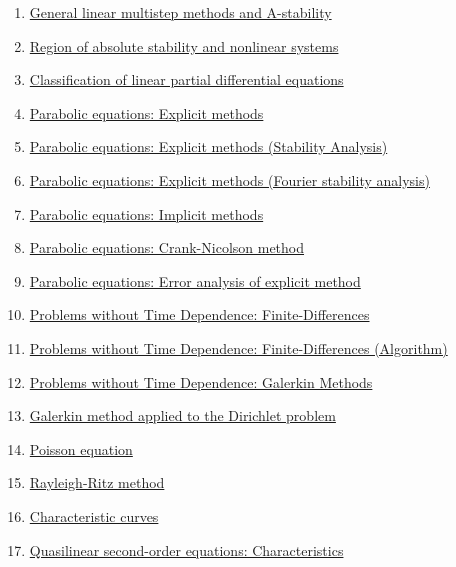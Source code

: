 \documentclass[11pt]{article}
\begin{document}
\begin{enumerate}
	\item \href{https://mp.weixin.qq.com/s/Xu8PFG19wgOVUeJvb6GUMw}{General linear multistep methods and A-stability}	%
	\item \href{https://mp.weixin.qq.com/s/x_Q63zezD9Idly3rqU3O4A}{Region of absolute stability and nonlinear systems}	%
	\item \href{https://mp.weixin.qq.com/s/hQwLSIUxOQRqCAEDzQWGiw}{Classification of linear partial differential equations}	%
	\item \href{https://mp.weixin.qq.com/s/6Jt0I-7cW339sH1v0oyqOQ}{Parabolic equations: Explicit methods}	%
	\item \href{https://mp.weixin.qq.com/s/jhksCPMaXOu-9Y_eLyW7fA}{Parabolic equations: Explicit methods (Stability Analysis)}	%
	\item \href{https://mp.weixin.qq.com/s/nS8FEpAsGxcsuu7hAsRSEg}{Parabolic equations: Explicit methods (Fourier stability analysis)}	%
	\item \href{https://mp.weixin.qq.com/s/n-fPLB8Njg2L0btFBCn7dA}{Parabolic equations: Implicit methods}	%
	\item \href{https://mp.weixin.qq.com/s/fYdvq50W_Diw039Y-z7edA}{Parabolic equations: Crank-Nicolson method}	%
	\item \href{https://mp.weixin.qq.com/s/EtnsYTlfSP5DghytGGcWTw}{Parabolic equations: Error analysis of explicit method}	%
	\item \href{https://mp.weixin.qq.com/s/gMZmGNhHuwFk8HuR9bAHSA}{Problems without Time Dependence: Finite-Differences}	%
	\item \href{https://mp.weixin.qq.com/s/YKzkJg3_shBJeKD24UVEfg}{Problems without Time Dependence: Finite-Differences (Algorithm)}	%
	\item \href{https://mp.weixin.qq.com/s/VFTq8TpZoqnIZEi-NHFEpw}{Problems without Time Dependence: Galerkin Methods}	%
	\item \href{https://mp.weixin.qq.com/s/Bj8yA-qnGVRNjC7Jf6r7WA}{Galerkin method applied to the Dirichlet problem}	%
	\item \href{https://mp.weixin.qq.com/s/jZx_Cdt-M01n8DMY8KMooA}{Poisson equation}	%
	\item \href{https://mp.weixin.qq.com/s/29LiSPPCv6ZlHgJqqalYRg}{Rayleigh-Ritz method}	%
	\item \href{https://mp.weixin.qq.com/s/TTnK1I3yoRxjqn2bIzCGig}{Characteristic curves}	%
	\item \href{https://mp.weixin.qq.com/s/mE6DI923pZIApgfytRNe5A}{Quasilinear second-order equations: Characteristics}	%
\end{enumerate}
\end{document}
